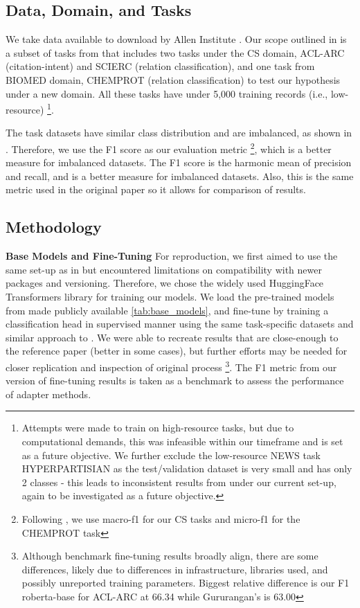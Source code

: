 \documentclass[10pt,twocolumn,letterpaper]{article}
\begin{document}
\subsection{Data, Domain, and Tasks} 
We take data available to download by Allen Institute \cite{allenai_dont_stop_pretraining}. Our scope outlined in  is a subset of tasks from \cite{gururangan2020dont} that includes two tasks under the CS domain, ACL-ARC (citation-intent) and SCIERC (relation classification), and one task from BIOMED domain, CHEMPROT (relation classification) to test our hypothesis under a new domain. All these tasks have under 5,000 training records (i.e., low-resource) \footnote{Attempts were made to train on high-resource tasks, but due to computational demands, this was infeasible within our timeframe and is set as a future objective. We further exclude the low-resource NEWS task HYPERPARTISIAN as the test/validation dataset is very small and has only 2 classes - this leads to inconsistent results from \cite{allenai_dont_stop_pretraining} under our current set-up, again to be investigated as a future objective.}.

The task datasets have similar class distribution and are imbalanced, as shown in . Therefore, we use the F1 score as our evaluation metric \footnote{Following \cite{gururangan2020dont}, we use macro-f1 for our CS tasks and micro-f1 for the CHEMPROT task}, which is a better measure for imbalanced datasets. The F1 score is the harmonic mean of precision and recall, and is a better measure for imbalanced datasets. Also, this is the same metric used in the original paper \cite{gururangan2020dont} so it allows for comparison of results.

\subsection{Methodology} 

\textbf{Base Models and Fine-Tuning} For reproduction, we first aimed to use the same set-up as in \cite{allenai_dont_stop_pretraining} but encountered limitations on compatibility with newer packages and versioning. Therefore, we chose the widely used HuggingFace Transformers library \cite{transformers} for training our models. We load the pre-trained models from \cite{allenai_dont_stop_pretraining} made publicly available \ref{tab:base_models}, and fine-tune by training a classification head in supervised manner using the same task-specific datasets and similar approach to \cite{gururangan2020dont}. We were able to recreate results that are close-enough to the reference paper (better in some cases), but further efforts may be needed for closer replication and inspection of original process \footnote{Although benchmark fine-tuning results broadly align, there are some differences, likely due to differences in infrastructure, libraries used, and possibly unreported training parameters. Biggest relative difference is our F1 roberta-base for ACL-ARC at 66.34 while Gururangan’s is 63.00}. The F1 metric from our version of fine-tuning results is taken as a benchmark to assess the performance of adapter methods.
\end{document}
